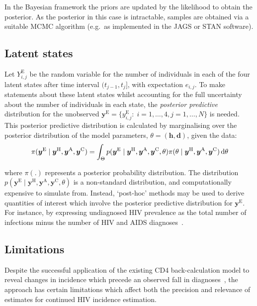 In the Bayesian framework the priors are updated by the likelihood to obtain the posterior. As the posterior in this case is intractable, samples are obtained via a suitable MCMC algorithm (e.g.\ as implemented in the JAGS or STAN software).

\subsection{Latent states}

Let $Y^\text{E}_{i,j}$ be the random variable for the number of individuals in each of the four latent states after time interval $(t_{j-1},t_j]$, with expectation $e_{i,j}$. To make statements about these latent states whilst accounting for the full uncertainty about the number of individuals in each state, the \textit{posterior predictive} distribution for the unobserved $\bm{y}^\text{E} = \{y_{i,j}^\text{E}:\; i = 1,\ldots,4, j = 1,\ldots,N\}$ is needed. This posterior predictive distribution is calculated by marginalising over the posterior distribution of the model parameters, $\theta=(\bm{h},\bm{d})$, given the data:
%
\begin{align*}
  \pi(\bm{y}^\text{E} \mid \bm{y}^\text{H},\bm{y}^\text{A},\bm{y}^\text{C}) = \int_\Theta p(\bm{y}^\text{E} \mid \bm{y}^\text{H},\bm{y}^\text{A},\bm{y}^\text{C},\theta) \pi(\theta \mid  \bm{y}^\text{H},\bm{y}^\text{A},\bm{y}^\text{C}) \mathop{}\!\mathrm{d}\theta
\end{align*}

where $\pi(.)$ represents a posterior probability distribution. The distribution $p(\bm{y}^\text{E} \mid \bm{y}^\text{H},\bm{y}^\text{A},\bm{y}^\text{C},\theta)$ is a non-standard distribution, and computationally expensive to simulate from. Instead, `post-hoc' methods may be used to derive quantities of interest which involve the posterior predictive distribution for $\bm{y}^\text{E}$. For instance, by expressing undiagnosed HIV prevalence as the total number of infections minus the number of HIV and AIDS diagnoses~\parencite{Birrell2012-hw}.

\subsection{Limitations}

Despite the successful application of the existing CD4 back-calculation model to reveal changes in incidence which precede an observed fall in diagnoses~\parencite{Brizzi2021-zl}, the approach has certain limitations which affect both the precision and relevance of estimates for continued HIV incidence estimation.


